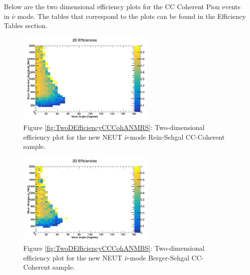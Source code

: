 \documentclass[11pt]{article}
\begin{document}
Below are the two dimensional efficiency plots for the CC Coherent Pion events in $\bar{\nu}$ mode. The tables that correspond to the plots can be found in the Efficiency Tables section.

\begin{figure}[H]
\centering
\includegraphics[width=0.6\textwidth]{CCCohPlots/2DEffANMRS.png}
\caption*{Figure \ref*{fig:TwoDEfficiencyCCCohANMRS}: Two-dimensional efficiency plot for the new NEUT $\bar{\nu}$-mode Rein-Sehgal CC-Coherent sample.}
\end{figure}\label{fig:TwoDEfficiencyCCCohANMRS}

\begin{figure}[H]
\centering
\includegraphics[width=0.6\textwidth]{CCCohPlots/2DEffANMBS.png}
\caption*{Figure \ref*{fig:TwoDEfficiencyCCCohANMBS}: Two-dimensional efficiency plot for the new NEUT $\bar{\nu}$-mode Berger-Sehgal CC-Coherent sample.}
\end{figure}\label{fig:TwoDEfficiencyCCCohANMBS}



%
\newpage

\appendix


\end{document}
